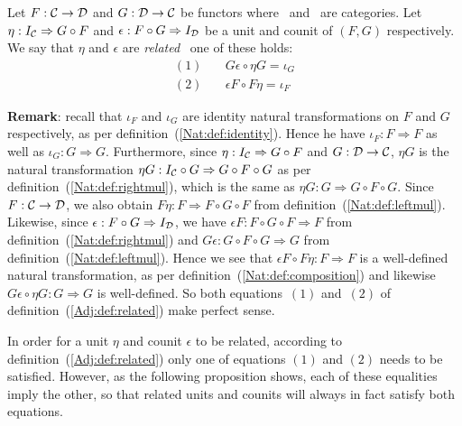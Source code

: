 \begin{defin}\label{Adj:def:related}
    Let $F:\mbox{$\cal C$}\to\mbox{$\cal D$}$ and $G:\mbox{$\cal D$}\to\mbox{$\cal C$}$ be functors where \Cat\ and \Dat\ 
    are categories. Let $\eta:I_{\cal C}\Rightarrow G\circ F$ and 
    $\epsilon:F\circ G\Rightarrow I_{\cal D}$ be a unit and counit of $(F,G)$ 
    respectively. We say that $\eta$ and $\epsilon$ are {\em related} \ifand\ 
    one of these holds:
        \begin{eqnarray*}
            (1)&\ &G\epsilon\circ\eta G=\iota_{G}\\
            (2)&\ &\epsilon F \circ F\eta=\iota_{F}
        \end{eqnarray*}
\end{defin}
{\bf Remark}: recall that $\iota_{F}$ and $\iota_{G}$ are identity natural
transformations on $F$ and $G$ respectively, as per 
definition~(\ref{Nat:def:identity}). Hence he have $\iota_{F}:F\Rightarrow F$
as well as $\iota_{G}:G\Rightarrow G$. Furthermore, since $\eta:I_{\cal C}
\Rightarrow G\circ F$ and $G:\mbox{$\cal D$}\to\mbox{$\cal C$}$, $\eta G$ is the natural transformation 
$\eta G:I_{\cal C}\circ G\Rightarrow G\circ F\circ G$ as per 
definition~(\ref{Nat:def:rightmul}), which is the same as $\eta G:G\Rightarrow
G\circ F\circ G$. Since $F:\mbox{$\cal C$}\to\mbox{$\cal D$}$, we also obtain $F\eta:F\Rightarrow 
F\circ G\circ F$ from definition~(\ref{Nat:def:leftmul}). Likewise, since 
$\epsilon:F\circ G\Rightarrow I_{\cal D}$, we have $\epsilon F:F\circ G\circ F
\Rightarrow F$ from definition~(\ref{Nat:def:rightmul}) and $G\epsilon:G\circ 
F\circ G\Rightarrow G$ from definition~(\ref{Nat:def:leftmul}). Hence we 
see that $\epsilon F\circ F\eta:F\Rightarrow F$ is a well-defined natural
transformation, as per definition~(\ref{Nat:def:composition}) and likewise
$G\epsilon\circ\eta G:G\Rightarrow G$ is well-defined. So both equations~$(1)$
and~$(2)$ of definition~(\ref{Adj:def:related}) make perfect sense.

In order for a unit $\eta$ and counit $\epsilon$ to be related, according 
to definition~(\ref{Adj:def:related}) only one of equations $(1)$ and $(2)$
needs to be satisfied. However, as the following proposition shows, each of
these equalities imply the other, so that related units and counits will 
always in fact satisfy both equations.

